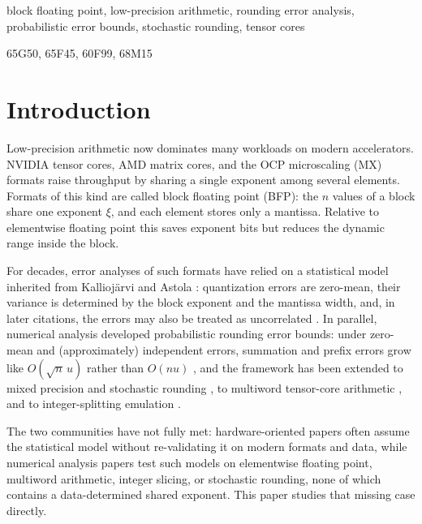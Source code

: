 \documentclass[twocolumn,review,hidelinks,oneeqnum,onetabnum,onefignum,onethmnum]{siamart251216}
\begin{document}
\begin{keywords}
block floating point, low-precision arithmetic, rounding error analysis,
probabilistic error bounds, stochastic rounding, tensor cores
\end{keywords}

\begin{MSCcodes}
65G50, 65F45, 60F99, 68M15
\end{MSCcodes}

\section{Introduction}
\label{sec:intro}

Low-precision arithmetic now dominates many workloads on modern accelerators.
NVIDIA tensor cores, AMD matrix cores, and the OCP microscaling (MX) formats
raise throughput by sharing a single exponent among several elements. Formats
of this kind are called block floating point (BFP): the $n$ values of a block
share one exponent $\xi$, and each element stores only a mantissa. Relative to
elementwise floating point this saves exponent bits but reduces the dynamic
range inside the block.

For decades, error analyses of such formats have relied on a statistical model
inherited from Kallioj\"arvi and Astola \cite{kalliojarvi1996}: quantization
errors are zero-mean, their variance is determined by the block exponent and
the mantissa width, and, in later citations, the errors may also be treated as
uncorrelated \cite{lian2019,song2018,fan2018,han2025}. In parallel, numerical
analysis developed probabilistic rounding error bounds: under zero-mean and
(approximately) independent errors, summation and prefix errors grow like
$O(\sqrt n\,u)$ rather than $O(nu)$
\cite{higham2002,higham2022,hallman2023}, and the framework has been extended
to mixed precision and stochastic rounding
\cite{higham2019,elarar2024,bhola2024a,bhola2024b,croci2022,drineas2024,elarar2026},
to multiword tensor-core arithmetic \cite{fasi2023}, and to integer-splitting
emulation \cite{abdelfattah2025}.

The two communities have not fully met: hardware-oriented papers often assume the
statistical model without re-validating it on modern formats and data, while
numerical analysis papers test such models on elementwise floating point, multiword
arithmetic, integer slicing, or stochastic rounding, none of which contains a
data-determined shared exponent. This paper studies that missing case directly.
\end{document}
